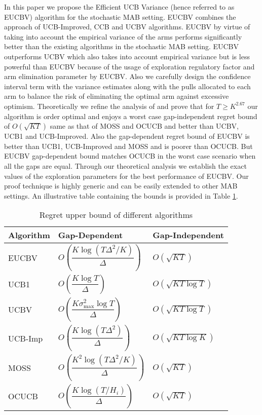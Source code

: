 In this paper we propose the Efficient UCB Variance (hence referred to as EUCBV) algorithm for the stochastic MAB setting. EUCBV combines the approach of UCB-Improved, CCB \citep{liu2016modification} and UCBV algorithms. EUCBV by virtue of taking into account the empirical variance of the arms performs significantly better than the existing algorithms in the stochastic MAB setting. EUCBV outperforms UCBV \citep{audibert2009exploration} which also takes into account empirical variance but is less powerful than EUCBV because of the usage of exploration regulatory factor and arm elimination parameter by EUCBV. Also we carefully design the confidence interval term with the variance estimates along with the pulls allocated to each arm to balance the risk of eliminating the optimal arm against excessive optimism.   Theoretically we refine the analysis of \citet{auer2010ucb} and prove that for $T\geq K^{2.67}$ our algorithm is order optimal and enjoys a worst case gap-independent regret bound of $O\left( \sqrt{KT} \right)$ same as that of MOSS and OCUCB and better than UCBV, UCB1 and UCB-Improved. Also the gap-dependent regret bound of EUCBV is better than UCB1, UCB-Improved and MOSS and is poorer than OCUCB. But EUCBV gap-dependent bound matches OCUCB in the worst case scenario when all the gaps are equal. Through our theoretical analysis we establish the exact values of the exploration parameters for the best performance of EUCBV. Our proof technique is highly generic and can be easily extended to other MAB settings. An illustrative table containing the bounds is provided in Table \ref{tab:comp-bds}. 

\begin{table}
\caption{Regret upper bound of different algorithms}
\label{tab:comp-bds}
\begin{center}
\begin{tabular}{p{6em}p{12em}p{10em}}
\toprule
Algorithm  & Gap-Dependent & Gap-Independent \\
\hline
EUCBV		& $O\left( \dfrac{K\log (T\Delta^2 /K)}{\Delta}\right)$ & $O\left(\sqrt{KT}\right)$\\
UCB1        & $O\left( \dfrac{K\log T}{\Delta} \right)$ & $O\left(\sqrt{KT\log T}\right)$ \\%
UCBV        & $O\left( \dfrac{K\sigma_{\max}^{2}\log T}{\Delta} \right)$ & $O\left(\sqrt{KT\log T}\right)$ \\
UCB-Imp 		& $O\left( \dfrac{K\log (T\Delta^2)}{\Delta} \right)$ & $O\left(\sqrt{KT\log K}\right)$ \\%
MOSS	     	& $O\left( \dfrac{K^2\log (T\Delta^2 /K)}{\Delta}\right)$ & $O\left(\sqrt{KT}\right)$\\%
OCUCB     	& $O\left( \dfrac{K\log (T/ H_{i})}{\Delta}\right)$ & $O\left(\sqrt{KT}\right)$\\\midrule
\end{tabular}
\end{center}
\vspace*{-2em}
\end{table}

